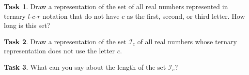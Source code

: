 \documentclass[12pt]{amsart}
\theoremstyle{definition}
\newtheorem{task}{Task}
\begin{document}
\begin{task}
Draw a representation of the set of all real numbers represented in ternary $l$-$c$-$r$ notation that do not have $c$ as the first, second, or third letter.
How long is this set? \\
\end{task}

\begin{task}
Draw a representation of the set $\mathcal{I}_c$ of all real numbers whose ternary representation does not use the letter $c$. \\
\end{task}

\begin{task}
What can you say about the length of the set $\mathcal{I}_c$?
\end{task}
\end{document}
